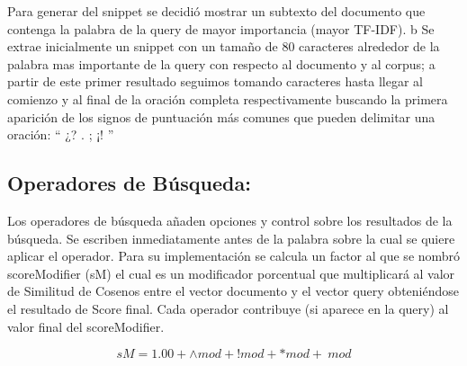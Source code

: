 \documentclass[a4paper,12pt]{article}
\begin{document}
Para generar del snippet se decidió mostrar un subtexto del documento que contenga la palabra
de la query de mayor importancia (mayor TF-IDF). b Se extrae inicialmente un snippet con un
tamaño de 80 caracteres alrededor de la palabra mas importante de la query con respecto al
documento y al corpus; a partir de este primer resultado seguimos tomando caracteres hasta
llegar al comienzo y al final de la oración completa respectivamente buscando la primera
aparición de los signos de puntuación más comunes que pueden delimitar una oración: “ ¿? .
; ¡! ”

\subsection{Operadores de Búsqueda:}
Los operadores de búsqueda añaden opciones y control sobre los resultados de la búsqueda.
Se escriben inmediatamente antes de la palabra sobre la cual se quiere aplicar el operador.
Para su implementación se calcula un factor al que se nombró scoreModifier (sM) el cual es un
modificador porcentual que multiplicará al valor de Similitud de Cosenos entre el vector
documento y el vector query obteniéndose el resultado de Score final. Cada operador contribuye
(si aparece en la query) al valor final del scoreModifier.
    \begin{center}
    \begin{equation}
       sM = 1.00 + \wedge mod + !mod +  *mod + ~mod
    \end{equation}
    \end{center}
\end{document}
